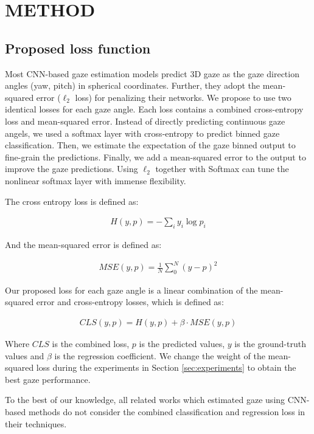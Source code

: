 \documentclass{article}
\begin{document}
\section{METHOD}
\label{sec:method}
\subsection{Proposed loss function}
Most CNN-based gaze estimation models predict 3D gaze as the gaze direction angles (yaw, pitch) in spherical coordinates. Further, they adopt the mean-squared error ($\ell_2$ loss) for penalizing their networks. We propose to use two identical losses for each gaze angle. Each loss contains a combined cross-entropy loss and mean-squared error. Instead of directly predicting continuous gaze angels, we used a softmax layer with cross-entropy to predict binned gaze classification. Then, we estimate the expectation of the gaze binned output to fine-grain the predictions. Finally, we add a mean-squared error to the output to improve the gaze predictions. Using $\ell_2$ together with Softmax can tune the nonlinear softmax layer with immense flexibility.


The cross entropy loss is defined as:

\begin{align*}
H(y,p) = - \sum_{i} y_{i} \log p_{i}
\end{align*}


And the mean-squared error is defined as:

\begin{align*}
MSE(y, p) = \frac{1}{N} \sum_{0}^{N} \left ( y-p \right )^{2}
\end{align*}

Our proposed loss for each gaze angle is a linear combination of the mean-squared error and cross-entropy losses, which is defined as:

\begin{align*}
CLS(y, p) = H(y,p)+ \beta \cdot MSE(y, p)
\end{align*}

Where $CLS$ is the combined loss, $p$ is the predicted values, $y$ is the ground-truth values and $\beta$ is the regression coefficient. We change the weight of the mean-squared loss during the experiments in Section \ref{sec:experiments} to obtain the best gaze performance. 

To the best of our knowledge, all related works which estimated gaze using CNN-based methods do not consider the combined classification and regression loss in their techniques.
\end{document}
